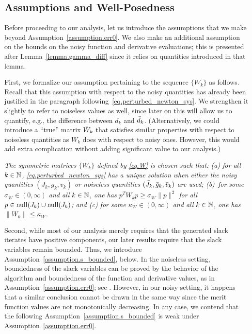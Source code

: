 \subsection{Assumptions and Well-Posedness}\label{sec.assumptions}

Before proceeding to our analysis, let us introduce the assumptions that we make beyond Assumption~\ref{assumption.err0}.  We also make an additional assumption on the bounds on the noisy function and derivative evaluations; this is presented after Lemma~\ref{lemma.gamma_diff} since it relies on quantities introduced in that lemma.

First, we formalize our assumption pertaining to the sequence $\{W_k\}$ as follows.  Recall that this assumption with respect to the noisy quantities has already been justified in the paragraph following~\eqref{eq.perturbed_newton_sys}.  We strengthen it slightly to refer to noiseless values as well, since later on this will allow us to quantify, e.g., the difference between $d_k$ and ${\bar d}_k$.  (Alternatively, we could introduce a ``true'' matrix ${\bar W}_k$ that satisfies similar properties with respect to noiseless quantities as $W_k$ does with respect to noisy ones.  However, this would add extra complication without adding significant value to our analysis.)

\begin{assumption} \label{assumption.bounded}
  \textit{
  The symmetric matrices $\{W_k\}$ defined by \eqref{eq.W} is chosen such that: (a) for all $k \in \mathbb{N}$, \eqref{eq.perturbed_newton_sys} has a unique solution when either the noisy quantities $(J_k, g_k, v_k)$ or noiseless quantities $({\bar J}_k, {\bar g}_k, {\bar v}_k)$ are used; (b)~for some $\sigma_W \in (0,\infty)$ and all $k \in \mathbb{N}$, one has $p^T W_k p \geq \sigma_W \|p\|^2$ for all $p \in \mathrm{null}(J_k) \cup \mathrm{null}({\bar J}_k)$; and (c) for some $\kappa_W \in (0,\infty)$ and all $k \in \mathbb{N}$, one has $\|W_k\| \leq \kappa_W$.
  }
\end{assumption}

Second, while most of our analysis merely requires that the generated slack iterates have positive components, our later results require that the slack variables remain bounded.  Thus, we introduce Assumption~\ref{assumption.s_bounded}, below.  In the noiseless setting, boundedness of the slack variables can be proved by the behavior of the algorithm and boundedness of the function and derivative values, as in Assumption~\ref{assumption.err0}; see \cite{byrd2000trust,CurtScheWaec10}.  However, in our noisy setting, it happens that a similar conclusion cannot be drawn in the same way since the merit function values are not monotonically decreasing.  In any case, we contend that the following Assumption~\ref{assumption.s_bounded} is weak under Assumption~\ref{assumption.err0}.

